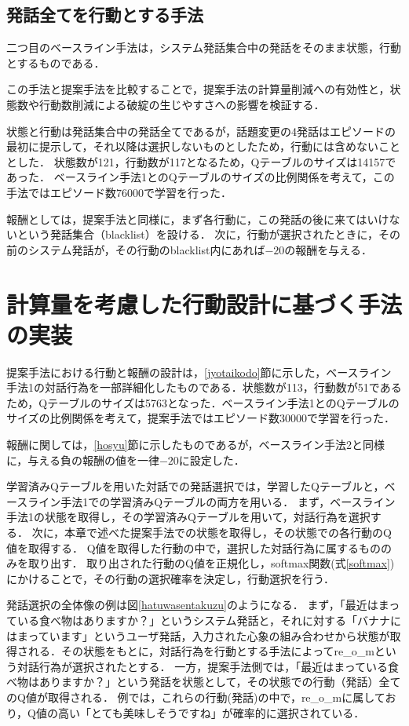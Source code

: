 \documentclass[12pt,a4paper,twoside,openany]{jbook}
\begin{document}
\subsection{発話全てを行動とする手法}
二つ目のベースライン手法は，システム発話集合中の発話をそのまま状態，行動とするものである．

この手法と提案手法を比較することで，提案手法の計算量削減への有効性と，状態数や行動数削減による破綻の生じやすさへの影響を検証する．

状態と行動は発話集合中の発話全てであるが，話題変更の4発話はエピソードの最初に提示して，それ以降は選択しないものとしたため，行動には含めないこととした．
状態数が121，行動数が117となるため，Qテーブルのサイズは14157であった．
ベースライン手法1とのQテーブルのサイズの比例関係を考えて，この手法ではエピソード数76000で学習を行った．

報酬としては，提案手法と同様に，まず各行動に，この発話の後に来てはいけないという発話集合（blacklist）を設ける．
次に，行動が選択されたときに，その前のシステム発話が，その行動のblacklist内にあれば$-20$の報酬を与える．





\section{計算量を考慮した行動設計に基づく手法の実装}\label{teianjissou}
提案手法における行動と報酬の設計は，\ref{jyotaikodo}節に示した，ベースライン手法1の対話行為を一部詳細化したものである．状態数が113，行動数が51であるため，Qテーブルのサイズは5763となった．ベースライン手法1とのQテーブルのサイズの比例関係を考えて，提案手法ではエピソード数30000で学習を行った．

報酬に関しては，\ref{hosyu}節に示したものであるが，ベースライン手法2と同様に，与える負の報酬の値を一律$-20$に設定した．

学習済みQテーブルを用いた対話での発話選択では，学習したQテーブルと，ベースライン手法1での学習済みQテーブルの両方を用いる．
まず，ベースライン手法1の状態を取得し，その学習済みQテーブルを用いて，対話行為を選択する．
次に，本章で述べた提案手法での状態を取得し，その状態での各行動のQ値を取得する．
Q値を取得した行動の中で，選択した対話行為に属するもののみを取り出す．
取り出された行動のQ値を正規化し，softmax関数(式\ref{softmax})にかけることで，その行動の選択確率を決定し，行動選択を行う．

発話選択の全体像の例は図\ref{hatuwasentakuzu}のようになる．
まず，「最近はまっている食べ物はありますか？」というシステム発話と，それに対する「バナナにはまっています」というユーザ発話，入力された心象の組み合わせから状態が取得される．その状態をもとに，対話行為を行動とする手法によってre\_o\_mという対話行為が選択されたとする．
一方，提案手法側では，「最近はまっている食べ物はありますか？」という発話を状態として，その状態での行動（発話）全てのQ値が取得される．
例では，これらの行動(発話)の中で，re\_o\_mに属しており，Q値の高い「とても美味しそうですね」が確率的に選択されている．
\end{document}
